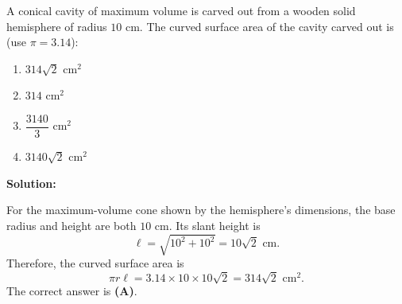 \documentclass[journal]{IEEEtran}
\begin{document}
\vspace{1.2em}
\begin{list}{}{\setlength{\leftmargin}{1.15cm}\setlength{\labelwidth}{1.0cm}\setlength{\labelsep}{0.15cm}\setlength{\itemindent}{0pt}\setlength{\listparindent}{0pt}\setlength{\parsep}{0pt}\setlength{\topsep}{0pt}}
\item[5.1.7] A conical cavity of maximum volume is carved out from a wooden solid hemisphere of radius $10$ cm. The curved surface area of the cavity carved out is (use $\pi=3.14$):

\begin{enumerate}
    \item[(A)] $314\sqrt{2}\text{ cm}^2$
    \item[(B)] $314\text{ cm}^2$
    \item[(C)] $\dfrac{3140}{3}\text{ cm}^2$
    \item[(D)] $3140\sqrt{2}\text{ cm}^2$
\end{enumerate}

\vspace{0.7em}\par\noindent\textbf{Solution:}

For the maximum-volume cone shown by the hemisphere's dimensions, the base radius and height are both $10$ cm. Its slant height is
\[
\ell=\sqrt{10^2+10^2}=10\sqrt{2}\text{ cm}.
\]
Therefore, the curved surface area is
\[
\pi r\ell=3.14\times 10\times 10\sqrt{2}=314\sqrt{2}\text{ cm}^2.
\]
The correct answer is \textbf{(A)}.

\end{list}
\vspace{1.2em}
\end{document}

